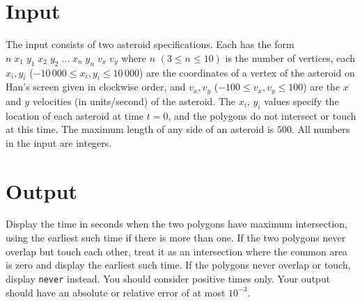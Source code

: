 \section*{Input}
The input consists of two asteroid specifications. Each has the form $n\;x_{1}\;y_{1}\;x_{2}\;y_{2}\;\ldots\;x_{n}\;y_{n}\;v_{x}\;v_{y}$ where $n$ $(3 \le n \le 10)$ is the number of vertices, each $x_{i}, y_{i}$ ($-10\,000 \le x_{i}, y_{i} \le 10\,000$) are the coordinates of a vertex of the asteroid on Han's screen given in clockwise order, and $v_{x}, v_{y}$ ($-100 \le v_{x}, v_{y} \le 100$) are the $x$ and $y$ velocities (in units/second) of the asteroid. The $x_{i}$, $y_{i}$ values specify the location of each asteroid at time $t=0$, and the polygons do not intersect or touch at this time. The maximum length of any side of an asteroid is $500$. All numbers in the input are integers.


\section*{Output}

Display the time in seconds when the two polygons have maximum intersection, using the earliest such time if there is more than one. If the two polygons never overlap but touch each other, treat it as an intersection where the common area is zero and display the earliest such time. If the polygons never overlap or touch, display \texttt{never} instead.  You should consider positive times only. Your output should have an absolute or relative error of at most $10^{-3}$. 
